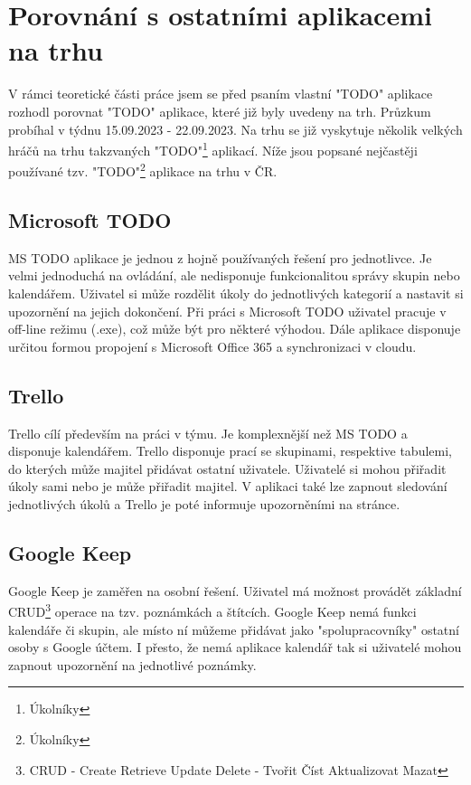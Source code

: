 \chapter{Porovnání s ostatními aplikacemi na trhu}
V rámci teoretické části práce jsem se před psaním vlastní "TODO" aplikace rozhodl porovnat "TODO" aplikace, které již byly uvedeny na trh. Průzkum probíhal v týdnu 15.09.2023 - 22.09.2023.
Na trhu se již vyskytuje několik velkých hráčů na trhu takzvaných "TODO"\footnote{Úkolníky} aplikací. Níže jsou popsané nejčastěji používané tzv. "TODO"\footnote{Úkolníky} aplikace na trhu v ČR.
\section{Microsoft TODO}
MS TODO aplikace je jednou z hojně používaných řešení pro jednotlivce. Je velmi jednoduchá na ovládání, ale nedisponuje funkcionalitou správy skupin nebo kalendářem. Uživatel si může rozdělit úkoly do jednotlivých kategorií a nastavit si upozornění na jejich dokončení. Při práci s Microsoft TODO uživatel pracuje v off-line režimu (.exe), což může být pro některé výhodou. Dále aplikace disponuje určitou formou propojení s Microsoft Office 365 a synchronizaci v cloudu.
\section{Trello}
Trello cílí především na práci v týmu. Je komplexnější než MS TODO a disponuje kalendářem. Trello disponuje prací se skupinami, respektive tabulemi, do kterých může majitel přidávat ostatní uživatele. Uživatelé si mohou přiřadit úkoly sami nebo je může přiřadit majitel. V aplikaci také lze zapnout sledování jednotlivých úkolů a Trello je poté informuje upozorněními na stránce.
\section{Google Keep}
Google Keep je zaměřen na osobní řešení. Uživatel má možnost provádět základní CRUD\footnote{CRUD - Create Retrieve Update Delete - Tvořit Číst Aktualizovat Mazat} operace na tzv. poznámkách a štítcích. Google Keep nemá funkci kalendáře či skupin, ale místo ní můžeme přidávat jako "spolupracovníky" ostatní osoby s Google účtem. I přesto, že nemá aplikace kalendář tak si uživatelé mohou zapnout upozornění na jednotlivé poznámky.
